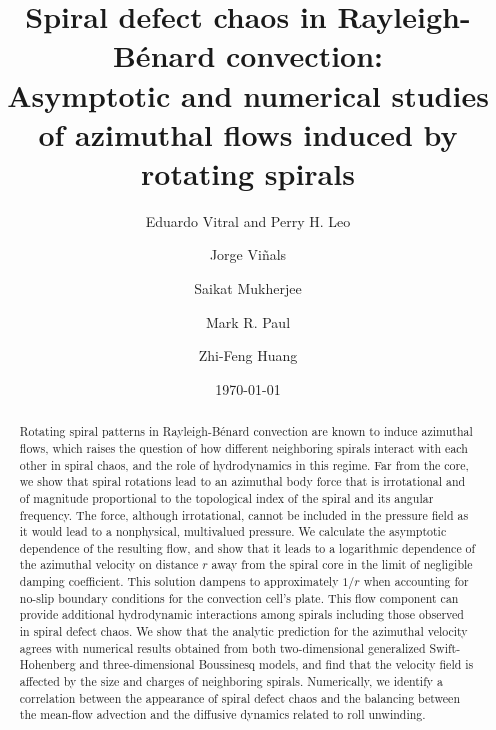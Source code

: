 \documentclass[preprint,prx,floatfix]{revtex4-1}
\begin{document}
\title{Spiral defect chaos in Rayleigh-B\'enard convection: \\Asymptotic and numerical studies of azimuthal flows induced by rotating spirals}

\author{Eduardo Vitral and Perry H. Leo}
\author{Jorge Vi\~nals}
\author{Saikat Mukherjee}
\author{Mark R. Paul}
\author{Zhi-Feng Huang}

\begin{abstract}
Rotating spiral patterns in Rayleigh-B\'enard convection are known to induce azimuthal flows, which raises the question of how different neighboring spirals interact with each other in spiral chaos, and the role of hydrodynamics in this regime. Far from the core, we show that spiral rotations lead to an azimuthal body force that is irrotational and of magnitude proportional to the topological index of the spiral and its angular frequency. The force, although irrotational, cannot be included in the pressure field as it would lead to a nonphysical, multivalued pressure. We calculate the asymptotic dependence of the resulting flow, and show that it leads to a logarithmic dependence of the azimuthal velocity on distance $r$ away from the spiral core in the limit of negligible damping coefficient. This solution dampens to approximately $1/r$ when accounting for no-slip boundary conditions for the convection cell's plate. This flow component can provide additional hydrodynamic interactions among spirals including those observed in spiral defect chaos. We show that the analytic prediction for the azimuthal velocity agrees with numerical results obtained from both two-dimensional generalized Swift-Hohenberg and three-dimensional Boussinesq models, and find that the velocity field is affected by the size and charges of neighboring spirals. Numerically, we identify a correlation between the appearance of spiral defect chaos and the balancing between the mean-flow advection and the diffusive dynamics related to roll unwinding.
\end{abstract}
\date{\today}
\end{document}
